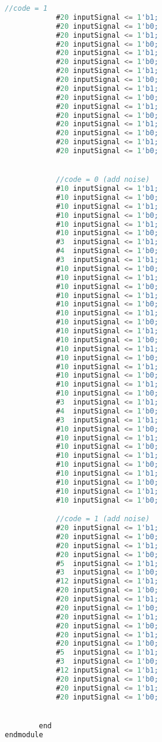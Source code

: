 \documentclass{progartcn}
\begin{document}
\begin{lstlisting}[language=TypeScript,caption={deFSK\_tb.v}]
            //code = 1
            #20 inputSignal <= 1'b1;
            #20 inputSignal <= 1'b0;
            #20 inputSignal <= 1'b1;
            #20 inputSignal <= 1'b0;
            #20 inputSignal <= 1'b1;
            #20 inputSignal <= 1'b0;
            #20 inputSignal <= 1'b1;
            #20 inputSignal <= 1'b0;
            #20 inputSignal <= 1'b1;
            #20 inputSignal <= 1'b0;
            #20 inputSignal <= 1'b1;
            #20 inputSignal <= 1'b0;
            #20 inputSignal <= 1'b1;
            #20 inputSignal <= 1'b0;
            #20 inputSignal <= 1'b1;
            #20 inputSignal <= 1'b0;


            //code = 0 (add noise)
            #10 inputSignal <= 1'b1;
            #10 inputSignal <= 1'b0;
            #10 inputSignal <= 1'b1;
            #10 inputSignal <= 1'b0;
            #10 inputSignal <= 1'b1;
            #10 inputSignal <= 1'b0;
            #3  inputSignal <= 1'b1;
            #4  inputSignal <= 1'b0;
            #3  inputSignal <= 1'b1;
            #10 inputSignal <= 1'b0;
            #10 inputSignal <= 1'b1;
            #10 inputSignal <= 1'b0;
            #10 inputSignal <= 1'b1;
            #10 inputSignal <= 1'b0;
            #10 inputSignal <= 1'b1;
            #10 inputSignal <= 1'b0;
            #10 inputSignal <= 1'b1;
            #10 inputSignal <= 1'b0;
            #10 inputSignal <= 1'b1;
            #10 inputSignal <= 1'b0;
            #10 inputSignal <= 1'b1;
            #10 inputSignal <= 1'b0;
            #10 inputSignal <= 1'b1;
            #10 inputSignal <= 1'b0;
            #3  inputSignal <= 1'b1;
            #4  inputSignal <= 1'b0;
            #3  inputSignal <= 1'b1;
            #10 inputSignal <= 1'b0;
            #10 inputSignal <= 1'b1;
            #10 inputSignal <= 1'b0;
            #10 inputSignal <= 1'b1;
            #10 inputSignal <= 1'b0;
            #10 inputSignal <= 1'b1;
            #10 inputSignal <= 1'b0;
            #10 inputSignal <= 1'b1;
            #10 inputSignal <= 1'b0;

            //code = 1 (add noise)
            #20 inputSignal <= 1'b1;
            #20 inputSignal <= 1'b0;
            #20 inputSignal <= 1'b1;
            #20 inputSignal <= 1'b0;
            #5  inputSignal <= 1'b1;
            #3  inputSignal <= 1'b0;
            #12 inputSignal <= 1'b1;
            #20 inputSignal <= 1'b0;
            #20 inputSignal <= 1'b1;
            #20 inputSignal <= 1'b0;
            #20 inputSignal <= 1'b1;
            #20 inputSignal <= 1'b0;
            #20 inputSignal <= 1'b1;
            #20 inputSignal <= 1'b0;
            #5  inputSignal <= 1'b1;
            #3  inputSignal <= 1'b0;
            #12 inputSignal <= 1'b1;
            #20 inputSignal <= 1'b0;
            #20 inputSignal <= 1'b1;
            #20 inputSignal <= 1'b0;


        end
endmodule
\end{lstlisting}
\end{document}
